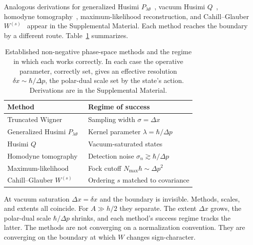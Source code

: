 \documentclass[%
  aps, reprint, pra, amsmath,amssymb
]{revtex4-2}
\begin{document}
Analogous derivations for generalized Husimi $P_{\lambda\theta}$~\cite{wodkiewicz1984}, vacuum Husimi $Q$~\cite{husimi1940}, homodyne tomography~\cite{lvovsky2009}, maximum-likelihood reconstruction, and Cahill--Glauber $W^{(s)}$~\cite{cahillglauber1969} appear in the Supplemental Material. Each method reaches the boundary by a different route. Table~\ref{tab:effective_resolution} summarizes.


\begin{table}[t]
\centering
\caption{Established non-negative phase-space methods and the regime in which each works correctly. In each case the operative parameter, correctly set, gives an effective resolution $\delta x \sim \hbar/\Delta p$, the polar-dual scale set by the state's action. Derivations are in the Supplemental Material.}
\label{tab:effective_resolution}
\begin{ruledtabular}
\begin{tabular}{@{}p{}p{}@{}}
Method & Regime of success \\
\hline
Truncated Wigner~\cite{polkovnikov2010} & Sampling width $\sigma = \Delta x$ \\
Generalized Husimi $P_{\lambda\theta}$~\cite{wodkiewicz1984} & Kernel parameter $\lambda = \hbar/\Delta p$ \\
Husimi $Q$~\cite{husimi1940} & Vacuum-saturated states \\
Homodyne tomography~\cite{lvovsky2009} & Detection noise $\sigma_n \gtrsim \hbar/\Delta p$ \\
Maximum-likelihood & Fock cutoff $N_{\max}\hbar \sim \Delta p^2$ \\
Cahill--Glauber $W^{(s)}$~\cite{cahillglauber1969} & Ordering $s$ matched to covariance \\
\end{tabular}
\end{ruledtabular}
\end{table}

At vacuum saturation $\Delta x = \delta x$ and the boundary is invisible. Methods, scales, and extents all coincide. For $A \gg h/2$ they separate. The extent $\Delta x$ grows, the polar-dual scale $\hbar/\Delta p$ shrinks, and each method's success regime tracks the latter. The methods are not converging on a normalization convention. They are converging on the boundary at which $W$ changes sign-character.
\end{document}
